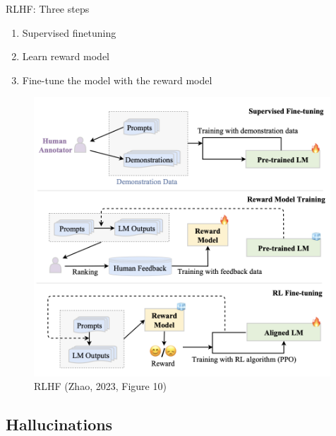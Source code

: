 \documentclass[10pt]{beamer}
\begin{document}
\begin{frame}{RLHF: Three steps}

\begin{enumerate}
\item Supervised finetuning %
\item Learn reward model %
\item Fine-tune the model with the reward model
\end{enumerate}

\begin{figure}[h]
\centering
\includegraphics[width=0.99\textwidth]{fig/zhao_2023_fig10}
\caption{RLHF (Zhao, 2023, Figure 10)}
\end{figure}

\end{frame}


\subsection{Hallucinations}
\end{document}
